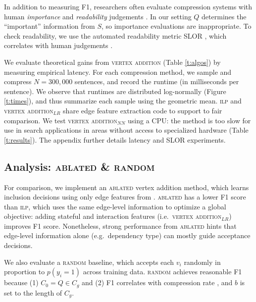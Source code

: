 \documentclass[11pt,a4paper]{article}
\begin{document}
{In addition to measuring F1, researchers often evaluate compression systems with human \textit{importance} and \textit{readability} judgements \cite{Knight2000StatisticsBasedS,filippova2015sentence}. In our setting $Q$ determines the ``important'' information from $S$, so importance evaluations are inappropriate. To check readability, we use the automated readability metric SLOR \cite{lau2015unsupervised}, which correlates with human judgements \cite{kannConl}. 

We evaluate theoretical gains from \textsc{vertex addition}  (Table \ref{t:algos}) by measuring empirical latency. For each compression method, we sample and compress $N=300,000$ sentences, and record the runtime (in milliseconds per sentence). We observe that runtimes are distributed log-normally (Figure \ref{t:times}), and thus summarize each sample using the geometric mean. \textsc{ilp} and \textsc{vertex addition}$_{LR}$ share edge feature extraction code to support to fair comparison. We test \textsc{vertex addition}$_{NN}$ using a CPU: the method is too slow for use in search applications in areas without access to specialized hardware (Table \ref{t:results}). The appendix further details latency and SLOR experiments.

\subsection{Analysis:  \textsc{ablated} \& \textsc{random}}\label{s:ablated}
For comparison, we implement an \textsc{ablated} vertex addition method, which learns inclusion decisions using only edge features from \citet{filippova2013overcoming}. \textsc{ablated} has a lower F1 score than \textsc{ilp}, which uses the same edge-level information to optimize a global objective: adding stateful and interaction features (i.e.\ \textsc{vertex addition}$_{LR}$) improves F1 score. Nonetheless, strong performance from \textsc{ablated} hints that edge-level information alone (e.g.\ dependency type) can mostly guide acceptance decisions.

We also evaluate a \textsc{random} baseline, which accepts each $v_i$ randomly in proportion to $p(y_i = 1)$ across training data. \textsc{random} achieves reasonable F1 because (1) $C_0 = Q \in C_g$ and (2) F1 correlates with compression rate \cite{napoles2011evaluating}, and $b$ is set to the length of $C_g$.


}
\end{document}

